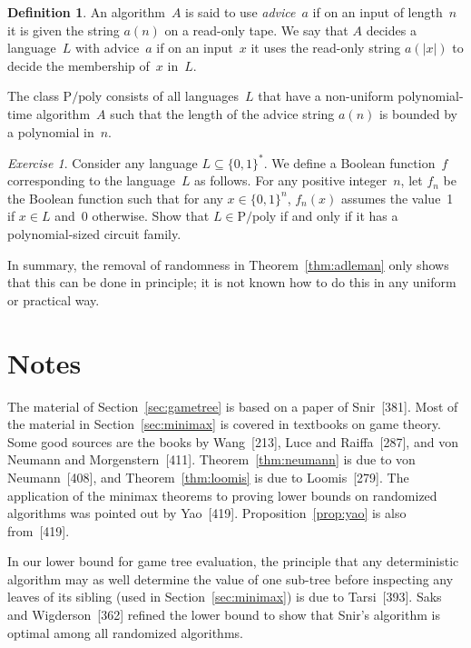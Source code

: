 \documentclass[twoside,12pt]{book}
\theoremstyle{plain}
\theoremstyle{definition}
\newtheorem{definition}[theorem]{Definition}
\theoremstyle{remark}
\newtheorem{exercise}[theorem]{Exercise}
\begin{document}
\begin{definition}
An algorithm~$A$ is said to use \emph{advice}~$a$ if on an input of length~$n$
it is given the string $a(n)$ on a read-only tape.  We say that $A$ decides a
language~$L$ with advice~$a$ if on an input~$x$ it uses the read-only string
$a(|x|)$ to decide the membership of~$x$ in~$L$.
\end{definition}

The class $\mathrm{P/poly}$ consists of all languages~$L$ that have a
non-uniform polynomial-time algorithm~$A$ such that the length of the advice
string $a(n)$ is bounded by a polynomial in~$n$.

\begin{exercise}
Consider any language $L\subseteq\{0,1\}^*$.  We define a Boolean
function~$f$ corresponding to the language~$L$ as follows.  For any positive
integer~$n$, let $f_n$ be the Boolean function such that for any
$x\in\{0,1\}^n$, $f_n(x)$ assumes the value~1 if $x\in L$ and~0 otherwise.
Show that $L\in\mathrm{P/poly}$ if and only if it has a polynomial-sized
circuit family.
\end{exercise}

In summary, the removal of randomness in Theorem~\ref{thm:adleman} only shows
that this can be done in principle; it is not known how to do this in any
uniform or practical way.

\section*{Notes}

The material of Section~\ref{sec:gametree} is based on a paper of
Snir~[381].  Most of the material in Section~\ref{sec:minimax} is covered in
textbooks on game theory.  Some good sources are the books by
Wang~[213], Luce and Raiffa~[287], and von Neumann and
Morgenstern~[411].  Theorem~\ref{thm:neumann} is due to von
Neumann~[408], and Theorem~\ref{thm:loomis} is due to Loomis~[279].  The
application of the minimax theorems to proving lower bounds on randomized
algorithms was pointed out by Yao~[419].  Proposition~\ref{prop:yao} is also
from~[419].

In our lower bound for game tree evaluation, the principle that any
deterministic algorithm may as well determine the value of one sub-tree before
inspecting any leaves of its sibling (used in
Section~\ref{sec:minimax}) is due to Tarsi~[393].  Saks and
Wigderson~[362] refined the lower bound to show that Snir's algorithm is
optimal among all randomized algorithms.
\end{document}
